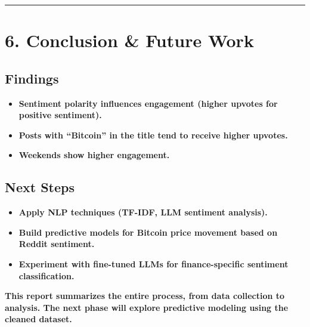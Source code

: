 \documentclass[
  letterpaper,
  DIV=11,
  numbers=noendperiod]{scrartcl}
\providecommand{\tightlist}{%
  \setlength{\itemsep}{0pt}\setlength{\parskip}{0pt}}\usepackage{longtable,booktabs,array}
\begin{document}
\begin{center}\rule{0.5\linewidth}{0.5pt}\end{center}

\section{\texorpdfstring{\textbf{6. Conclusion \& Future
Work}}{6. Conclusion \& Future Work}}\label{conclusion-future-work}

\subsection{\texorpdfstring{\textbf{Findings}}{Findings}}\label{findings}

\begin{itemize}
\tightlist
\item
  \textbf{Sentiment polarity influences engagement (higher upvotes for
  positive sentiment).}
\item
  \textbf{Posts with ``Bitcoin'' in the title tend to receive higher
  upvotes.}
\item
  \textbf{Weekends show higher engagement.}
\end{itemize}

\subsection{\texorpdfstring{\textbf{Next
Steps}}{Next Steps}}\label{next-steps}

\begin{itemize}
\tightlist
\item
  \textbf{Apply NLP techniques (TF-IDF, LLM sentiment analysis).}
\item
  \textbf{Build predictive models for Bitcoin price movement based on
  Reddit sentiment.}
\item
  \textbf{Experiment with fine-tuned LLMs for finance-specific sentiment
  classification.}
\end{itemize}

\textbf{This report summarizes the entire process, from data collection
to analysis. The next phase will explore predictive modeling using the
cleaned dataset.}
\end{document}
